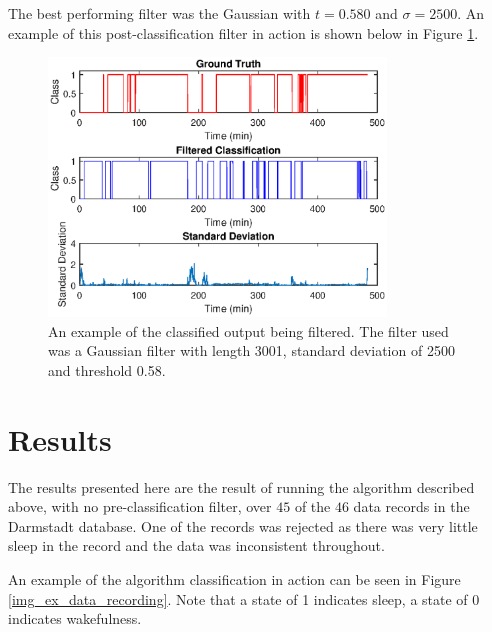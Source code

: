             The best performing filter was the Gaussian with $t=0.580$ and $\sigma=2500$. An example of this post-classification filter in action is shown below in Figure \ref{img_post_filter_ex}.

            \begin{figure}[h]
                \includegraphics[width=0.8\textwidth]{Images/post_prediction_filters_ex.eps}
                \centering
                \caption{An example of the classified output being filtered. The filter used was a Gaussian filter with length 3001, standard deviation of 2500 and threshold 0.58.}
                \label{img_post_filter_ex}
            \end{figure}


    \chapter{Results}

        The results presented here are the result of running the algorithm described above, with no pre-classification filter, over $45$ of the $46$ data records in the Darmstadt database. One of the records was rejected as there was very little sleep in the record and the data was inconsistent throughout.

        An example of the algorithm classification in action can be seen in Figure \ref{img_ex_data_recording}. Note that a state of 1 indicates sleep, a state of 0 indicates wakefulness. 

